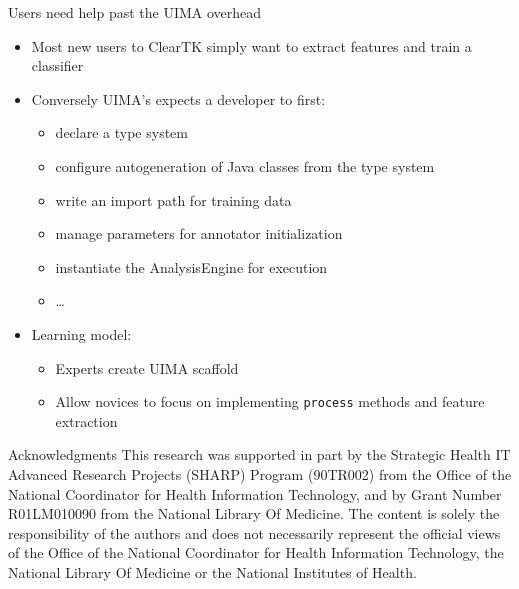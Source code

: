 \documentclass[final]{beamer}
\newcommand{\code}[1]{\texttt{\small #1}}
\begin{document}
\begin{frame}{}
\begin{columns}[t]
\begin{column}{.45\linewidth}
    \begin{block}{Users need help past the UIMA overhead}

            \begin{itemize}
                    \item Most new users to ClearTK simply want to extract features and train a classifier
                    \item Conversely UIMA's expects a developer to first:
                            \begin{itemize}
                                    \item declare a type system
                                    \item configure autogeneration of Java classes from the type system
                                    \item write an import path for training data
                                    \item manage parameters for annotator initialization
                                    \item instantiate the AnalysisEngine for execution
                                    \item \ldots
                            \end{itemize}
                    \item Learning model:
                            \begin{itemize}
                                    \item Experts create UIMA scaffold
                                    \item Allow novices to focus on implementing \code{process} methods and feature extraction
                            \end{itemize}

            \end{itemize}
    \end{block}

    \begin{block}{Acknowledgments}
            This research was supported in part by the Strategic Health IT Advanced Research Projects (SHARP) Program (90TR002) from the Office of the National Coordinator for Health Information Technology, and by Grant Number R01LM010090 from the National Library Of Medicine. The content is solely the responsibility of the authors and does not necessarily represent the official views of the Office of the National Coordinator for Health Information Technology, the National Library Of Medicine or the National Institutes of Health.

    \end{block}
    
   
  \end{column}

\end{columns}
\vfill
\end{frame}
\end{document}
